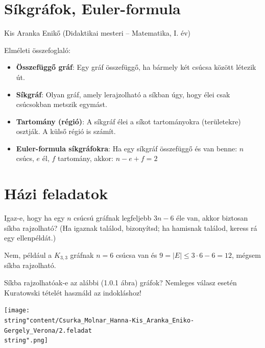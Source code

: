 \section{Síkgráfok, Euler-formula}\label{sec:sikgrafok}
\begin{description}
	{\large \item [{Szerző:}] Kis Aranka Enikő (Didaktikai mesteri -- Matematika, I. év) }
\end{description}
Elméleti összefoglaló: 
\begin{itemize}
	\item \textbf{Összefüggő gráf}: Egy gráf összefüggő, ha bármely két csúcsa
	között létezik út. 
	\item \textbf{Síkgráf}: Olyan gráf, amely lerajzolható a síkban úgy, hogy
	élei csak csúcsokban metszik egymást. 
	\item \textbf{Tartomány (régió)}: A síkgráf élei a síkot tartományokra (területekre)
	osztják. A külső régió is számít. 
	\item \textbf{Euler-formula síkgráfokra}: Ha egy síkgráf összefüggő és van
	benne: $n$ csúcs, $e$ él, $f$ tartomány, akkor: $n-e+f=2$
\end{itemize}

\section*{Házi feladatok}
\begin{problem}
	Igaz-e, hogy ha egy $n$ csúcsú gráfnak legfeljebb $3n-6$ éle van,
	akkor biztosan síkba rajzolható? (Ha igaznak találod, bizonyítsd;
	ha hamisnak találod, keress rá egy ellenpéldát.) 
\end{problem}

\begin{solution}
	Nem, például a $K_{3,3}$ gráfnak $n=6$ csúcsa van és $9=\left\lvert E\right\rvert \leq3\cdot6-6=12$,
	mégsem síkba rajzolható.
\end{solution}
\begin{problem}
	Síkba rajzolhatóak-e az alábbi (1.0.1 ábra) gráfok? Nemleges válasz
	esetén Kuratowski tételét használd az indokláshoz! 
	\begin{center}
		\texttt{[image: \\string"content/Csurka\_Molnar\_Hanna-Kis\_Aranka\_Eniko-Gergely\_Verona/2.feladat\\string".png]}
	\end{center}
\end{problem}

